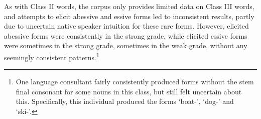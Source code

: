 \begin{table}
\begin{tabular}{ |r || c | c || c | c | }
\end{tabular}
\end{table}
As with Class II words, the corpus only provides limited data on Class III words, and attempts to elicit abessive and essive forms led to inconsistent results, partly due to uncertain native speaker intuition for these rare forms. However, elicited abessive forms were consistently in the strong grade, while elicited essive forms were sometimes in the strong grade, sometimes in the weak grade, without any seemingly consistent patterns.\footnote{One language consultant fairly consistently produced  forms without the stem final consonant for some nouns in this class, but still felt uncertain about this. Specifically, this individual produced the forms  ‘boat-’,  ‘dog-’ and  ‘ski-’.} 


